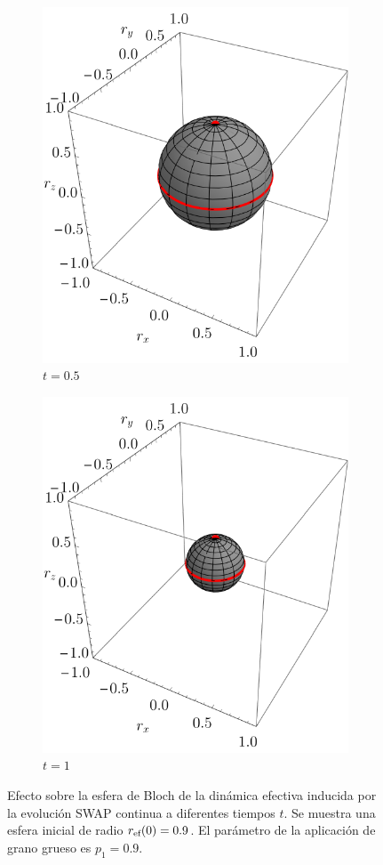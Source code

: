 \begin{figure}[ht!]
\begin{subfigure}{0.32\textwidth}
    \includegraphics[width=0.9\linewidth]{chapter4/figures_toy/SWAP_t=0.5_p=0.9_r=0.9.pdf}
    \caption{$t=0.5$}
  \end{subfigure}
  \begin{subfigure}{0.32\textwidth}
    \centering
    \includegraphics[width=0.9\linewidth]{chapter4/figures_toy/SWAP_t=1._p=0.9_r=0.9.pdf}
    \caption{$t=1$}
  \end{subfigure}
  \caption{Efecto sobre la esfera de Bloch de la dinámica efectiva inducida por la evolución SWAP continua a diferentes tiempos $t$. Se muestra una esfera inicial de radio $r_{\text{ef}}(0)=0.9$. El parámetro de la aplicación de grano grueso es $p_{1}=0.9$. \label{fig:SWAPFactorSequence}}
  \end{figure}

